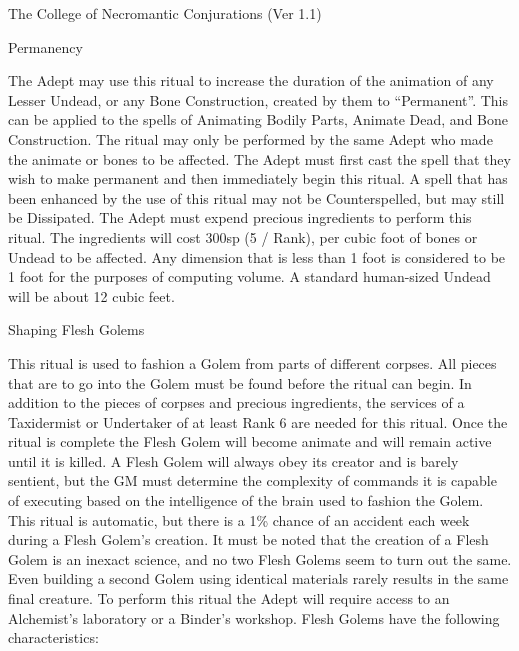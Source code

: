 \begin{Chapter}{The College of Necromantic Conjurations (Ver 1.1)}
\begin{ritual}[R-3]{Permanency}

\begin{effects}
The Adept may use this ritual to increase the duration of the
animation of any Lesser Undead, or any Bone Construction, created by
them to “Permanent”.  This can be applied to the spells of Animating
Bodily Parts, Animate Dead, and Bone Construction. The ritual may only
be performed by the same Adept who made the animate or bones to be
affected. The Adept must first cast the spell that they wish to make
permanent and then immediately begin this ritual.  A spell that has
been enhanced by the use of this ritual may not be Counterspelled,
but may still be Dissipated.  The Adept must expend precious
ingredients to perform this ritual.  The ingredients will cost 300sp
(5 / Rank), per cubic foot of bones or Undead to be affected.  Any
dimension that is less than 1 foot is considered to be 1 foot for the
purposes of computing volume.  A standard human-sized Undead will be
about 12 cubic feet.
\end{effects}
\end{ritual}

\begin{ritual}[R-4]{Shaping Flesh Golems}

\begin{effects}
This ritual is used to fashion a Golem from parts of different
corpses. All pieces that are to go into the Golem must be found before
the ritual can begin.  In addition to the pieces of corpses and
precious ingredients, the services of a Taxidermist or Undertaker of
at least Rank 6 are needed for this ritual. Once the ritual is
complete the Flesh Golem will become animate and will remain active
until it is killed. A Flesh Golem will always obey its creator and is
barely sentient, but the GM must determine the complexity of commands
it is capable of executing based on the intelligence of the brain used
to fashion the Golem. This ritual is automatic, but there is a 1\%
chance of an accident each week during a Flesh Golem’s creation.  It
must be noted that the creation of a Flesh Golem is an inexact
science, and no two Flesh Golems seem to turn out the same.  Even
building a second Golem using identical materials rarely results in
the same final creature.  To perform this ritual the Adept will
require access to an Alchemist’s laboratory or a Binder’s
workshop. Flesh Golems have the following characteristics:


\end{effects}
\end{ritual}
\end{Chapter}
